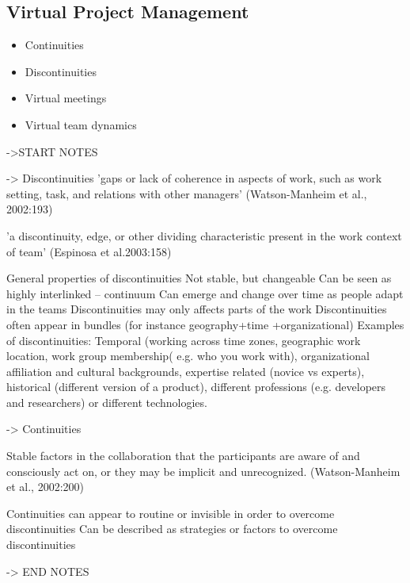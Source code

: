 \subsection{Virtual Project Management}
\begin{itemize}
  \item Continuities
  \item Discontinuities
  \item Virtual meetings
	\item Virtual team dynamics
\end{itemize}

->START NOTES

-> Discontinuities
'gaps or lack of coherence in aspects of work, such as work 
setting, task, and relations with other managers' (Watson-Manheim et al., 2002:193)

'a discontinuity, edge, or other dividing characteristic 
present in the work context of team' (Espinosa et al.2003:158)


General properties of discontinuities 
Not stable, but changeable 
Can be seen as highly interlinked – continuum
Can emerge and change over time as people adapt in the teams 
Discontinuities may only affects parts of the work 
Discontinuities often appear in bundles (for instance geography+time
+organizational)
Examples of discontinuities: Temporal (working across time zones, 
geographic work location, work group membership( e.g. who you work 
with), organizational affiliation and cultural backgrounds, expertise related 
(novice vs experts), historical (different version of a product), different 
professions (e.g. developers and researchers) or different technologies.

-> Continuities

Stable factors in the collaboration that the participants are 
aware of and consciously act on, or they may be implicit and 
unrecognized. (Watson-Manheim et al., 2002:200) 

Continuities can appear to routine or invisible in order to 
overcome discontinuities
Can be described as strategies or factors to overcome 
discontinuities

-> END NOTES

